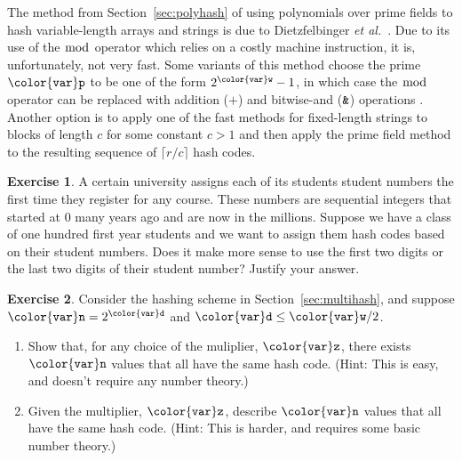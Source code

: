 \documentclass[10pt]{book}
\newcommand{\secref}[1]{Section~\ref{sec:#1}}
\theoremstyle{plain}
\theoremstyle{definition}
\newtheorem{exc}{Exercise}[chapter]
\newcommand{\etal}{\emph{et al.}}
\begin{document}
The method from \secref{polyhash} of using polynomials over prime fields
to hash variable-length arrays and strings is due to Dietzfelbinger \etal\
\cite{dgmp92}.  Due to its use of the $\bmod$ operator which relies
on a costly machine instruction, it is, unfortunately, not very fast.
Some variants of this method choose the prime \ensuremath{\mathtt{{\color{var}p}}} to be one of the form
$2^{\ensuremath{\mathtt{{\color{var}w}}}}-1$, in which case the $\bmod$ operator can be replaced with
addition (\ensuremath{\mathtt{+}}) and bitwise-and (\ensuremath{\mathtt{\text{\ttfamily \&}}}) operations \cite[Section~3.6]{k97v2}.
Another option is to apply one of the fast methods for fixed-length
strings to blocks of length $c$ for some constant $c>1$ and then apply
the prime field method to the resulting sequence of $\lceil r/c\rceil$
hash codes.


\begin{exc}
  A certain university assigns each of its students student numbers the
  first time they register for any course.  These numbers are sequential
  integers that started at 0 many years ago and are now in the millions.
  Suppose we have a class of one hundred first year students and we want
  to assign them hash codes based on their student numbers.  Does it
  make more sense to use the first two digits or the last two digits of
  their student number?  Justify your answer.
\end{exc}

\begin{exc}
  Consider the hashing scheme in \secref{multihash}, and suppose
  $\ensuremath{\mathtt{{\color{var}n}}}=2^{\ensuremath{\mathtt{{\color{var}d}}}}$ and $\ensuremath{\mathtt{{\color{var}d}}}\le \ensuremath{\mathtt{{\color{var}w}}}/2$.
  \begin{enumerate}
    \item Show that, for any choice
      of the muliplier, \ensuremath{\mathtt{{\color{var}z}}}, there exists \ensuremath{\mathtt{{\color{var}n}}} values that all have
      the same hash code. (Hint: This is easy, and doesn't require any
      number theory.)
    \item Given the multiplier, \ensuremath{\mathtt{{\color{var}z}}}, describe \ensuremath{\mathtt{{\color{var}n}}} values that all
      have the same hash code.  (Hint: This is harder, and requires
      some basic number theory.)
  \end{enumerate}
\end{exc}
\end{document}
